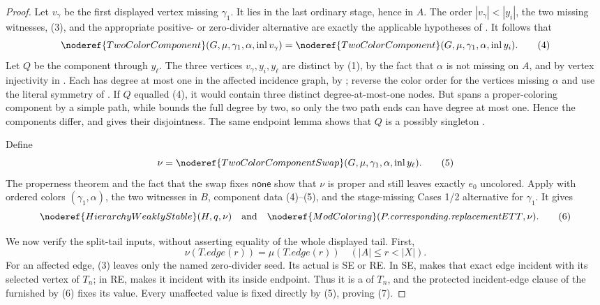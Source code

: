\begin{proof}
Let \(v_\gamma\) be the first displayed vertex missing \(\gamma_1\).
It lies in the last ordinary stage, hence in \(A\).  The order
\(|v_\gamma|<|y_i|\), the two missing witnesses, (3), and the appropriate
positive- or zero-divider alternative are exactly the applicable
hypotheses of .  It follows that
\[
 \noderef{TwoColorComponent}(G,\mu,\gamma_1,\alpha,
          \operatorname{inl}v_\gamma)
 =
 \noderef{TwoColorComponent}(G,\mu,\gamma_1,\alpha,
          \operatorname{inl}y_i).                            \tag{4}
\]
Let \(Q\) be the component through \(y_\ell\).  The three vertices
\(v_\gamma,y_i,y_\ell\) are distinct by (1), by the fact that
\(\alpha\) is not missing on \(A\), and by vertex injectivity in
.  Each has degree at most one in the affected
incidence graph, by ; reverse the
color order for the vertices missing \(\alpha\) and use the literal
symmetry of .  If \(Q\) equalled (4), it
would contain three distinct degree-at-most-one nodes.  But
 spans a proper-coloring component
by a simple path, while  bounds
the full degree by two, so only the two path ends can have degree at most
one.  Hence the components differ, and
 gives their disjointness.  The same
endpoint lemma shows that \(Q\) is a possibly singleton
.

Define
\[
 \nu=\noderef{TwoColorComponentSwap}
       (G,\mu,\gamma_1,\alpha,\operatorname{inl}y_\ell).      \tag{5}
\]
The properness theorem  and the fact
that the swap fixes \(\mathsf{none}\) show that \(\nu\) is proper and
still leaves exactly \(e_0\) uncolored.  Apply
 with ordered colors
\((\gamma_1,\alpha)\), the two witnesses in \(B\), component data (4)--(5),
and the stage-missing Cases 1/2 alternative for \(\gamma_1\).  It gives
\[
 \noderef{HierarchyWeaklyStable}(H,q,\nu)
 \quad\text{and}\quad \noderef{ModColoring}(P.\mathit{corresponding}.
 \mathit{replacementETT},\nu).                              \tag{6}
\]

We now verify the split-tail inputs, without asserting equality of the
whole displayed tail.  First,
\[
 \nu(T.\mathit{edge}(r))=\mu(T.\mathit{edge}(r))
       \quad(|A|\le r<|X|).                                  \tag{7}
\]
For an affected edge, (3) leaves only the named zero-divider seed.  Its
actual  is SE or RE.  In SE,
 makes that exact edge incident with its
selected vertex of \(T_n\); in RE,
 makes it incident with its
inside endpoint.  Thus it is a  of \(T_n\),
and the protected incident-edge clause of the
 furnished by (6) fixes its value.  Every
unaffected value is fixed directly by (5), proving (7).


\end{proof}
